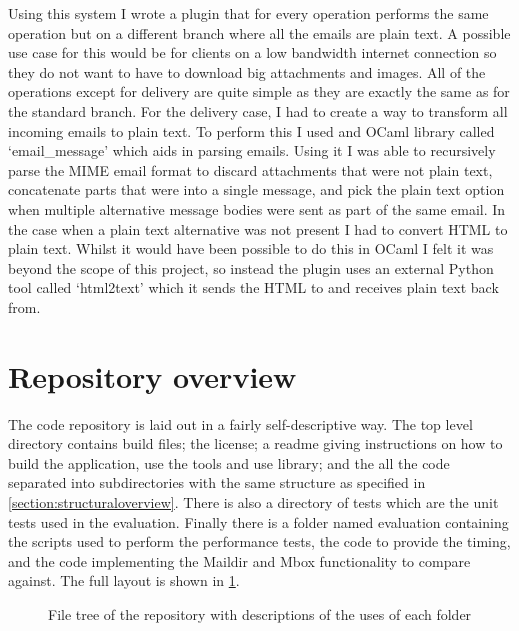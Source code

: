 Using this system I wrote a plugin that for every operation performs the same operation but on a different branch where all the emails are plain text. A possible use case for this would be for clients on a low bandwidth internet connection so they do not want to have to download big attachments and images. All of the operations except for delivery are quite simple as they are exactly the same as for the standard branch. For the delivery case, I had to create a way to transform all incoming emails to plain text. To perform this I used and OCaml library called `email\_message' which aids in parsing emails. Using it I was able to recursively parse the MIME email format to discard attachments that were not plain text, concatenate parts that were into a single message, and pick the plain text option when multiple alternative message bodies were sent as part of the same email. In the case when a plain text alternative was not present I had to convert HTML to plain text. Whilst it would have been possible to do this in OCaml I felt it was beyond the scope of this project, so instead the plugin uses an external Python tool called `html2text' which it sends the HTML to and receives plain text back from.

\section{Repository overview}

The code repository is laid out in a fairly self-descriptive way. The top level directory contains build files; the license; a readme giving instructions on how to build the application, use the tools and use library; and the all the code separated into subdirectories with the same structure as specified in \ref{section:structuraloverview}. There is also a directory of tests which are the unit tests used in the evaluation. Finally there is a folder named evaluation containing the scripts used to perform the performance tests, the code to provide the timing, and the code implementing the Maildir and Mbox functionality to compare against. The full layout is shown in \ref{fig:repositorytree}.

\begin{figure}[h]
\footnotesize
{}
\caption{File tree of the repository with descriptions of the uses of each folder}
\label{fig:repositorytree}
\end{figure}

